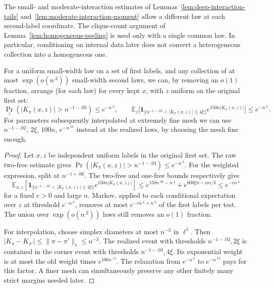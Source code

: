 The small- and moderate-interaction estimates of Lemmas~\ref{lem:deep-interaction-tails} and~\ref{lem:moderate-interaction-moment} allow a different law at each second-label coordinate. The clique-count argument of Lemma~\ref{lem:homogeneous-peeling} is used only with a single common law. In particular, conditioning on internal data later does not convert a heterogeneous collection into a homogeneous one.

\begin{lemma}\label{lem:simultaneous-row-trimming}
For a uniform small-width law on a set of first labels, and any collection of at most \(\exp(o(n^{.2}))\) small-width second laws, we can, by removing an \(o(1)\) fraction, arrange (for each law) for every kept \(x\), with \(z\) uniform on the original first set:
\begin{equation}
 \Pr_z(|K_\pi(x,z)|>n^{-1-.03})\le e^{-n^{.2}},\qquad
 \mathbb E_z\big[\mathbf1_{\{n^{-1-.03}<|K_\pi(x,z)|\le4\xi\}}
                       e^{150n|K_\pi(x,z)|}\big]\le e^{-n^{.2}} .
 \label{eq:source-11}
\end{equation}
For parameters subsequently interpolated at extremely fine mesh we can use \(n^{-1-.02},\,2\xi,\,100n,\,e^{-n^{.19}}\) instead at the realized laws, by choosing the mesh fine enough.
\end{lemma}

\begin{proof}
Let \(x,z\) be independent uniform labels in the original first set. The raw two-free estimate gives
\(\Pr(|K_\pi(x,z)|>n^{-1-.03})\le e^{-n^{.4}}\).
For the weighted expression, split at \(n^{-1+.06}\). The two-free and one-free bounds respectively give
\[
 \mathbb E_{x,z}\!\left[
  \mathbf1_{\{n^{-1-.03}<|K_\pi(x,z)|\le4\xi\}}
        e^{150n|K_\pi(x,z)|}\right]
 \le e^{150n^{.06}-n^{.4}}+e^{600\xi n-\alpha n/3}
 \le e^{-c n^{.4}}
\]
for a fixed \(c>0\) and large \(n\). Markov, applied to each conditional expectation over \(z\) at threshold \(e^{-n^{.2}}\), removes at most \(e^{-c n^{.4}+n^{.2}}\) of the first labels per test. The union over \(\exp(o(n^{.2}))\) laws still removes an \(o(1)\) fraction.

For interpolation, choose simplex diameters at most \(n^{-3}\) in \(\ell^1\). Then \(|K_\pi-K_{\pi'}|\le\|\pi-\pi'\|_1\le n^{-3}\). The realized event with thresholds \(n^{-1-.02},2\xi\) is contained in the corner event with thresholds \(n^{-1-.03},4\xi\). Its exponential weight is at most the old weight times \(e^{100n^{-2}}\). The relaxation from \(e^{-n^{.2}}\) to \(e^{-n^{.19}}\) pays for this factor. A finer mesh can simultaneously preserve any other finitely many strict margins needed later.
\end{proof}

